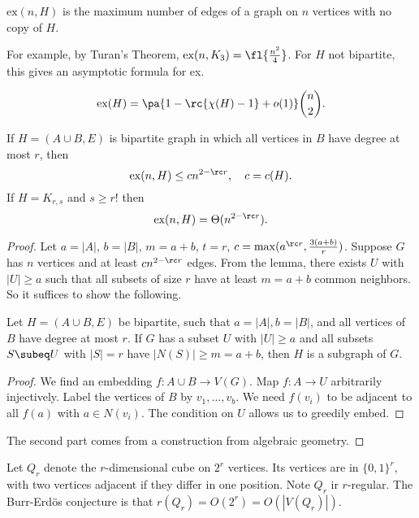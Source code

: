 \begin{df}
$\text{ex}(n,H)$ is the maximum number of edges of a graph on $n$ vertices with no copy of $H$.
\end{df}
For example, by Turan's Theorem, $\text{ex}(n,K_3)=\fl{\frac{n^2}{4}}$. %
For $H$ not bipartite, this gives an asymptotic formula for ex.
\begin{thm}%
\[
\text{ex}(H)=\pa{1-\rc{\chi(H)-1}+o(1)}\binom n2.
\]
\end{thm}

\begin{thm}
If $H=(A\cup B, E)$ is bipartite graph in which all vertices in $B$ have degree at most $r$, then
\[
\text{ex}(n,H)\le cn^{2-\rc r},\quad c=c(H).
\]
If $H=K_{r,s}$ and $s\ge r!$ then
\[
\text{ex}(n,H)=\Theta(n^{2-\rc r}).
\]
\end{thm}
\begin{proof}
Let $a=|A|$, $b=|B|$, $m=a+b$, $t=r$, $c=\max(a^{\rc r}, \frac{3(a+b)}{r})$. Suppose $G$ has $n$ vertices and at least $cn^{2-\rc r}$ edges. From the lemma, there exists $U$ with $|U|\ge a$ such that all subsets of size $r$ have at least $m=a+b$ common neighbors. So it suffices to show the following.
\begin{lem}
Let $H=(A\cup B,E)$ be bipartite, such that $a=|A|,b=|B|$, and all vertices of $B$ have degree at most $r$. If $G$ has a subset $U$ with $|U|\ge a$ and all subsets $S\subeq U$ with $|S|=r$ have $|N(S)|\ge m=a+b$, then $H$ is a subgraph of $G$.
\end{lem}
\begin{proof}
We find an embedding $f:A\cup B\to V(G)$. Map $f:A\to U$ arbitrarily injectively. Label the vertices of $B$ by $v_1,\ldots, v_b$. We need $f(v_i)$ to be adjacent to all $f(a)$ with $a\in N(v_i)$. The condition on $U$ allows us to greedily embed.
\end{proof}
The second part comes from a construction from algebraic geometry.
\end{proof}
Let $Q_r$ denote the $r$-dimensional cube on $2^r$ vertices. Its vertices are in $\{0,1\}^r$, with two vertices adjacent if they differ in one position. Note $Q_r$ ir $r$-regular. The Burr-Erd\"os conjecture is that $r(Q_r)=O(2^r)=O(|V(Q_r)|)$. 

